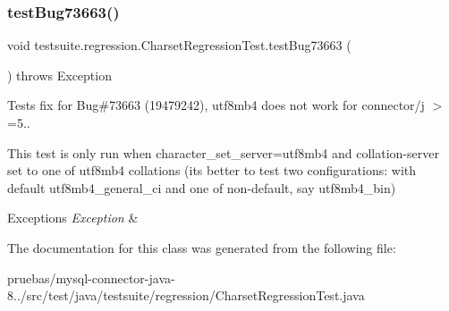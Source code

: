 \subsubsection{\texorpdfstring{test\+Bug73663()}{testBug73663()}}
{\footnotesize\ttfamily void testsuite.\+regression.\+Charset\+Regression\+Test.\+test\+Bug73663 (\begin{DoxyParamCaption}{ }\end{DoxyParamCaption}) throws Exception}

Tests fix for Bug\#73663 (19479242), utf8mb4 does not work for connector/j $>$=5..

This test is only run when character\+\_\+set\+\_\+server=utf8mb4 and collation-\/server set to one of utf8mb4 collations (it\textquotesingle{}s better to test two configurations\+: with default utf8mb4\+\_\+general\+\_\+ci and one of non-\/default, say utf8mb4\+\_\+bin)


\begin{DoxyExceptions}{Exceptions}
{\em Exception} & \\
\hline
\end{DoxyExceptions}


The documentation for this class was generated from the following file\+:\begin{DoxyCompactItemize}
\item 
pruebas/mysql-\/connector-\/java-\/8../src/test/java/testsuite/regression/Charset\+Regression\+Test.\+java\end{DoxyCompactItemize}
